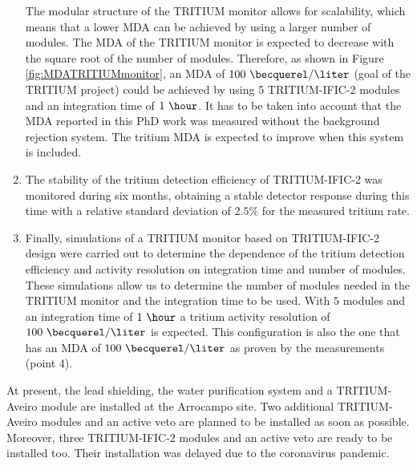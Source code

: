 \begin{enumerate}
The modular structure of the TRITIUM monitor allows for scalability, which means that a lower MDA can be achieved by using a larger number of modules. The MDA of the TRITIUM monitor is expected to decrease with the square root of the number of modules. Therefore, as shown in Figure \ref{fig:MDATRITIUMmonitor}, an MDA of  $100~\becquerel/\liter$ (goal of the TRITIUM project) could be achieved by using 5 TRITIUM-IFIC-2 modules and an integration time of $1~\hour$. It has to be taken into account that the MDA reported in this PhD work was measured without the background rejection system. The tritium MDA is expected to improve when this system is included.

\item{} The stability of the tritium detection efficiency of TRITIUM-IFIC-2 was monitored during six months, obtaining a stable detector response during this time with a relative standard deviation of $2.5\%$ for the measured tritium rate. 

\item{} Finally, simulations of a TRITIUM monitor based on TRITIUM-IFIC-2 design were carried out to determine the dependence of the tritium detection efficiency and activity resolution on integration time and number of modules. These simulations allow us to determine the number of modules needed in the TRITIUM monitor and the integration time to be used. With $5$ modules and an integration time of $1~\hour$ a tritium activity resolution of $100~\becquerel/\liter$ is expected. This configuration is also the one that has an MDA of $100~\becquerel/\liter$ as proven by the measurements (point 4).

\end{enumerate}

At present, the lead shielding, the water purification system and a TRITIUM-Aveiro module are installed at the Arrocampo site. Two additional TRITIUM-Aveiro modules and an active veto are planned to be installed as soon as possible. Moreover, three TRITIUM-IFIC-2 modules and an active veto are ready to be installed too. Their installation was delayed due to the coronavirus pandemic.